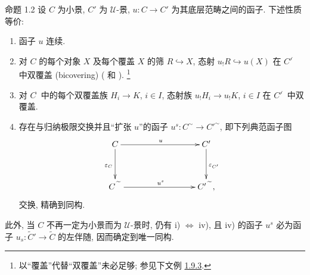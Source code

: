 \begin{enonce*}{命题 1.2}
设 $C$ 为小景, $C'$ 为 $𝒰$-景, $u:C\rightarrow C'$ 为其底层范畴之间的函子.
下述性质等价:
\begin{enumerate}
\renewcommand{\theenumi}{\roman{enumi}}
\renewcommand{\labelenumi}{\theenumi)}
\item 函子 $u$ 连续.

\item 对 $C$ 的每个对象 $X$ 及每个覆盖 $X$ 的筛 $R\hookrightarrow X$,
态射 $u_{!}R\hookrightarrow u(X)$ 在 ${C'}^{\widehat{\phantom{,}}}$ 中双覆盖 (bicovering)
{\rm( 和 ).}
\footnote[1]{以“覆盖”代替“双覆盖”未必足够; 参见下文例 \hyperref[III.exem1.9.3]{1.9.3}.}

\item 对 $C^{\widehat{\phantom{,}}}$ 中的每个双覆盖族 $H_i\rightarrow K$, $i\in I$,
态射族 $u_{!}H_i\rightarrow u_{!}K$, $i\in I$ 在 ${C'}^{\widehat{\phantom{,}}}$ 中双覆盖.

\item 存在与归纳极限交换并且“扩张 $u$”的函子
$u^s:C^{\sim}\rightarrow {C'}^{\sim}$, 即下列典范函子图
\[
\xymatrix@C=3cm@R=1.25cm{
  C \ar[r]^{u} \ar[d]_{\epsilon_C} & C' \ar[d]^{\epsilon_{C'}}\\
C{\widetilde{\phantom{A}}} \ar[r]^{u^s}&
  C'{\widetilde{\phantom{A}}},
}
\]
交换, 精确到同构.
\end{enumerate}

此外, 当 $C$ 不再一定为小景而为 $𝒰$-景时, 仍有 {\rm i) $\Leftrightarrow$ iv)},
且 {\rm iv)} 的函子 $u^s$ 必为函子 $u_s:\widetilde{C}'\rightarrow \widetilde{C}$ 的左伴随,
因而确定到唯一同构.
\end{enonce*}


